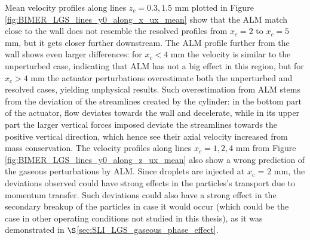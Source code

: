  Mean velocity profiles along lines $z_c = 0.3, 1.5$ mm plotted in Figure \ref{fig:BIMER_LGS_lines_y0_along_x_ux_mean} show that the ALM match close to the wall does not resemble the resolved profiles from $x_c = 2$ to  $x_c = 5$ mm, but it gets closer further downstream. The ALM profile further from the wall shows even larger differences: for $x_c < 4$ mm the velocity is similar to the unperturbed case, indicating that ALM has not a big effect in this region, but for $x_c > 4$ mm the actuator perturbations overestimate both the unperturbed and resolved cases, yielding unphysical results. Such overestimation from ALM stems from the deviation of the streamlines created by the cylinder: in the bottom part of the actuator, flow deviates towards the wall and decelerate, while in its upper part the larger vertical forces imposed deviate the streamlines towards the positive vertical direction, which hence see their axial velocity increased from mass conservation. The velocity profiles along lines $x_c = 1, 2, 4$ mm from Figure \ref{fig:BIMER_LGS_lines_y0_along_z_ux_mean} also show a wrong prediction of the gaseous perturbations by ALM. Since droplets are injected at $x_c$ = 2 mm, the deviations observed could have strong effects in the particles's transport due to momentum transfer. Such deviations could also have a strong effect in the secondary breakup of the particles in case it would occur (which could be the case in other operating conditions not studied in this thesis), as it was demonstrated in $\S$\ref{sec:SLI_LGS_gaseous_phase_effect}.
 


